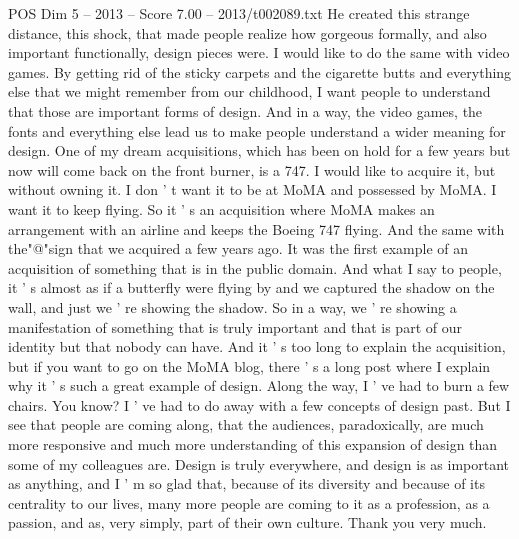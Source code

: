 \begin{textsample}{POS Dim 5 – 2013 – Score 7.00 – 2013/t002089.txt}
He created this strange distance, this shock, that made people realize how gorgeous formally, and also important functionally, design pieces were.
I would like to do the same with video games.
By getting rid of the sticky carpets and the cigarette butts and everything else that we might remember from our childhood, I want people to understand that those are important forms of design.
And in a way, the video games, the fonts and everything else lead us to make people understand a wider meaning for design.
One of my dream acquisitions, which has been on hold for a few years but now will come back on the front burner, is a 747.
I would like to acquire it, but without owning it.
I don ' t want it to be at MoMA and possessed by MoMA.
I want it to keep flying.
So it ' s an acquisition where MoMA makes an arrangement with an airline and keeps the Boeing 747 flying.
And the same with the"@"sign that we acquired a few years ago.
It was the first example of an acquisition of something that is in the public domain.
And what I say to people, it ' s almost as if a butterfly were flying by and we captured the shadow on the wall, and just we ' re showing the shadow.
So in a way, we ' re showing a manifestation of something that is truly important and that is part of our identity but that nobody can have.
And it ' s too long to explain the acquisition, but if you want to go on the MoMA blog, there ' s a long post where I explain why it ' s such a great example of design.
Along the way, I ' ve had to burn a few chairs.
You know?
I ' ve had to do away with a few concepts of design past.
But I see that people are coming along, that the audiences, paradoxically, are much more responsive and much more understanding of this expansion of design than some of my colleagues are.
Design is truly everywhere, and design is as important as anything, and I ' m so glad that, because of its diversity and because of its centrality to our lives, many more people are coming to it as a profession, as a passion, and as, very simply, part of their own culture.
Thank you very much.

\end{textsample}
